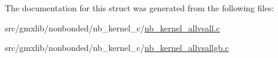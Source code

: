 \-The documentation for this struct was generated from the following files\-:\begin{DoxyCompactItemize}
\item 
src/gmxlib/nonbonded/nb\-\_\-kernel\-\_\-c/\hyperlink{nb__kernel__allvsall_8c}{nb\-\_\-kernel\-\_\-allvsall.\-c}\item 
src/gmxlib/nonbonded/nb\-\_\-kernel\-\_\-c/\hyperlink{nb__kernel__allvsallgb_8c}{nb\-\_\-kernel\-\_\-allvsallgb.\-c}\end{DoxyCompactItemize}
